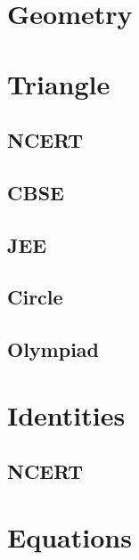 \documentclass[journal]{IEEEtran}
\begin{document}
\newpage


\tableofcontents

\newpage
\onecolumn


\renewcommand{\thetable}{\theenumi}

\section{Geometry}

\section{Triangle}
\subsection{NCERT}

\subsection{CBSE}

\subsection{JEE}
 
\subsection{Circle}

\subsection{Olympiad}

\section{Identities}
\subsection{NCERT}
 
\section{Equations}
\end{document}
